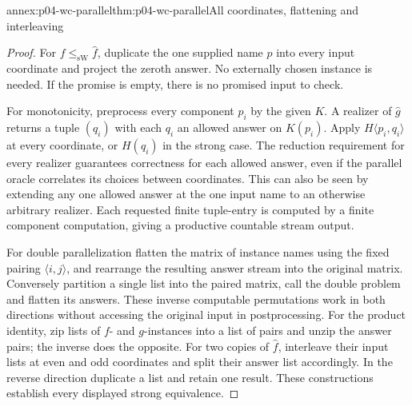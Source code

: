 \begin{annexitem}{annex:p04-wc-parallel}{thm:p04-wc-parallel}{All coordinates, flattening and interleaving}
\begin{proof}
For \(f\leq_{\mathrm{sW}}\widehat f\), duplicate the one supplied name
\(p\) into every input coordinate and project the zeroth answer.
No externally chosen instance is needed. If the promise is empty,
there is no promised input to check.

For monotonicity, preprocess every component \(p_i\) by the given
\(K\). A realizer of \(\widehat g\) returns a tuple \((q_i)\)
with each \(q_i\) an allowed answer on \(K(p_i)\).
Apply \(H\langle p_i,q_i\rangle\) at every coordinate, or
\(H(q_i)\) in the strong case. The reduction requirement for every
realizer guarantees correctness for each allowed answer, even if the
parallel oracle correlates its choices between coordinates. This can
also be seen by extending any one allowed answer at the one input name
to an otherwise arbitrary realizer. Each requested finite tuple-entry
is computed by a finite component computation, giving a productive
countable stream output.

For double parallelization flatten the matrix of instance names using
the fixed pairing \(\langle i,j\rangle\), and rearrange the resulting
answer stream into the original matrix. Conversely partition a single
list into the paired matrix, call the double problem and flatten its
answers. These inverse computable permutations work in both directions
without accessing the original input in postprocessing.
For the product identity, zip lists of \(f\)- and \(g\)-instances
into a list of pairs and unzip the answer pairs; the inverse does the
opposite. For two copies of \(\widehat f\), interleave their input
lists at even and odd coordinates and split their answer list accordingly.
In the reverse direction duplicate a list and retain one result. These
constructions establish every displayed strong equivalence.
\end{proof}
\end{annexitem}


